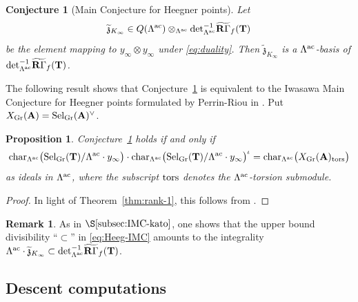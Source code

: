\documentclass[10pt,reqno]{amsart}
\numberwithin{equation}{section}
\theoremstyle{plain}
\theoremstyle{definition}
\newtheorem{rmk}[thm]{Remark}
\theoremstyle{definition}
\theoremstyle{plain}
\newtheorem{prop}[thm]{Proposition}
\theoremstyle{plain}
\theoremstyle{plain}
\theoremstyle{plain}
\newtheorem{conj}[thm]{Conjecture}
\theoremstyle{plain}
\theoremstyle{plain}
\newcommand{\Tac}{\mathbf{T}}
\begin{document}
\begin{conj}[Main Conjecture for Heegner points]\label{conj:HPMC-det}
Let
\[
\widetilde{\mathfrak{z}}_{K_\infty}\in Q(\Lambda^{\rm ac})\otimes_{\Lambda^{\rm ac}}{\rm det}_{\Lambda^{\rm ac}}^{-1}\widetilde{\mathbf{R}\Gamma}_f(\Tac)
\]
be the element mapping to $y_\infty\otimes y_\infty$ under \eqref{eq:duality}. Then $\widetilde{\mathfrak{z}}_{K_\infty}$  is  a $\Lambda^{\rm ac}$-basis of ${\rm det}_{\Lambda^{\rm ac}}^{-1}\widetilde{\mathbf{R}\Gamma}_f(\Tac)$.
\end{conj}

The following result shows that Conjecture~\ref{conj:HPMC-det} is equivalent to the Iwasawa Main Conjecture for Heegner points formulated by Perrin-Riou in \cite{perrinriou}. Put $X_{\rm Gr}(\mathbf{A})={\rm Sel}_{\rm Gr}(\mathbf{A})^\vee$.

\begin{prop}\label{prop:equiv-ac}
Conjecture~\ref{conj:HPMC-det} holds if and only if
\begin{equation}\label{eq:Heeg-IMC}
{\rm char}_{\Lambda^{\rm ac}}\bigl({\rm Sel}_{\rm Gr}(\Tac)/\Lambda^{\rm ac}\cdot y_\infty\bigr)\cdot
{\rm char}_{\Lambda^{\rm ac}}\bigl({\rm Sel}_{\rm Gr}(\Tac)/\Lambda^{\rm ac}\cdot y_\infty\bigr)^\iota={\rm char}_{\Lambda^{\rm ac}}\bigl(X_{\rm Gr}(\mathbf{A})_{\rm tors}\bigr)
\end{equation}
as ideals in $\Lambda^{\rm ac}$, where the subscript ${\rm tors}$ denotes the $\Lambda^{\rm ac}$-torsion submodule.
\end{prop}

\begin{proof}
In light of Theorem~\ref{thm:rank-1}, this follows from \cite[Prop.~5.12]{kataoka-sano}.
\end{proof}

\begin{rmk}\label{rem:div-det}
As in $\S\ref{subsec:IMC-kato}$, one shows that the upper bound divisibility ``$\subset$'' in \eqref{eq:Heeg-IMC} amounts to the integrality $\Lambda^{\rm ac}\cdot\widetilde{\mathfrak{z}}_{K_\infty}\subset{\det}_{\Lambda^{\rm ac}}^{-1}\widetilde{\mathbf{R}\Gamma}_f(\Tac)$.
\end{rmk}

\subsection{Descent computations}\label{subsec:descent-K}
\end{document}
